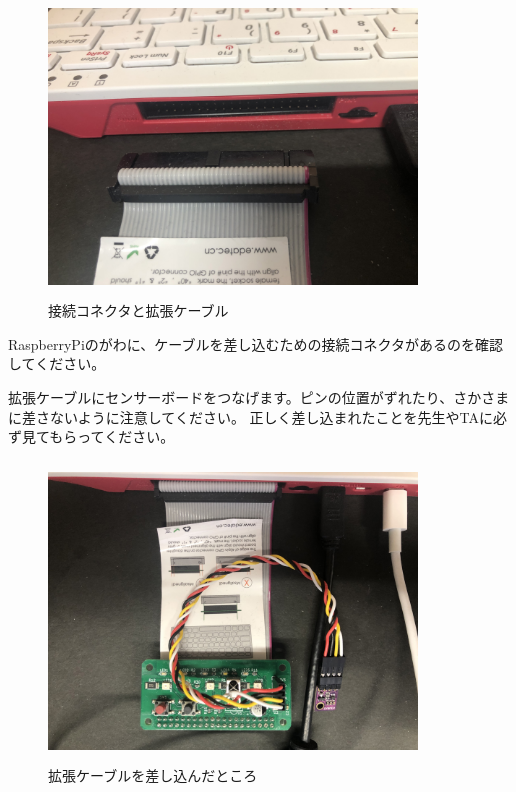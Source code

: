 \begin{figure}[H]
    \begin{center}
        \includegraphics[keepaspectratio,width=9.79cm,height=7.955cm]{text02-img/sensor2.jpg}
        \caption{接続コネクタと拡張ケーブル}
    \end{center}
\end{figure}

RaspberryPiのがわに、ケーブルを差し込むための接続コネクタがあるのを確認してください。

拡張ケーブルにセンサーボードをつなげます。ピンの位置がずれたり、さかさまに差さないように注意してください。
正しく差し込まれたことを先生やTAに必ず見てもらってください。

\begin{figure}[H]
    \begin{center}
        \includegraphics[keepaspectratio,width=9.79cm,height=7.955cm]{text02-img/sensor3.jpg}
        \caption{拡張ケーブルを差し込んだところ}
    \end{center}
\end{figure}

